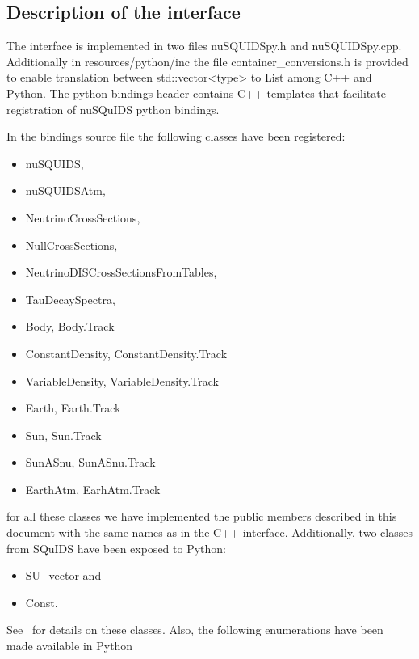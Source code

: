\documentclass[3p,12pt]{elsarticle}
\newcommand{\ttf}{\ttfamily}
\newcommand{\nuSQUIDS}{{\ttfamily nuSQUIDS}}
\begin{document}
\subsection{Description of the interface}

The interface is implemented in two files {\ttf nuSQUIDSpy.h} and {\ttf nuSQUIDSpy.cpp}. 
Additionally in {\ttf resources/python/inc} the file {\ttf container\_conversions.h} 
is provided to enable translation between {\ttf std::vector<type>} to  {\ttf List} among {\ttf C++} and {\ttf Python}. 
The python bindings header contains {\ttf C++} templates that facilitate registration of {\ttf nuSQuIDS} python bindings.

In the bindings source file the following classes have been registered:
\begin{itemize}
  \item \nuSQUIDS,
  \item {\ttf nuSQUIDSAtm},
  \item {\ttf NeutrinoCrossSections},
  \item {\ttf NullCrossSections},
  \item {\ttf NeutrinoDISCrossSectionsFromTables},
  \item {\ttf TauDecaySpectra},
  \item {\ttf Body}, {\ttf Body.Track}
  \item {\ttf ConstantDensity}, {\ttf ConstantDensity.Track}
  \item {\ttf VariableDensity}, {\ttf VariableDensity.Track}
  \item {\ttf Earth}, {\ttf Earth.Track}
  \item {\ttf Sun}, {\ttf Sun.Track}
  \item {\ttf SunASnu}, {\ttf SunASnu.Track}
  \item {\ttf EarthAtm}, {\ttf EarhAtm.Track}
\end{itemize}
for all these classes we have implemented the public members described in this document with 
the same names as in the {\ttf C++} interface. Additionally, two classes from SQuIDS have been exposed to {\ttf Python}:
\begin{itemize}
  \item {\ttf SU\_vector} and
  \item {\ttf Const}.
\end{itemize}
See~\cite{SQUIDS} for details on these classes. Also, the following enumerations have been made available in {\ttf Python}
\end{document}
